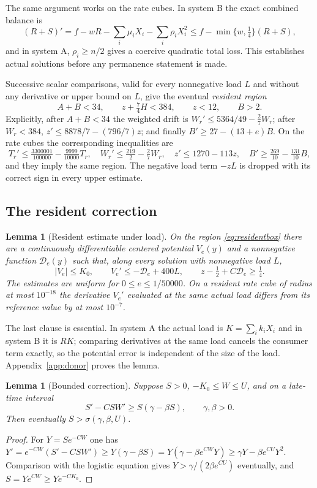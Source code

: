 \documentclass[11pt,a4paper]{article}
\theoremstyle{plain}
\newtheorem{lemma}[theorem]{Lemma}
\theoremstyle{definition}
\theoremstyle{remark}
\newcommand{\D}{\mathcal D}
\begin{document}
The same argument works on the rate cubes. In system B the exact combined balance is
\[
(R+S)'=f-wR-\sum_i\mu_iX_i-\sum_i\rho_iX_i^2\le f-\min\{w,\tfrac14\}(R+S),
\]
and in system A, $\rho_i\ge n/2$ gives a coercive quadratic total loss. This establishes actual solutions before any permanence statement is made.

Successive scalar comparisons, valid for every nonnegative load $L$ and without any derivative or upper bound on $L$, give the eventual \emph{resident region}
\begin{equation}\label{eq:residentbox}
A+B<34,\qquad z+\tfrac74H<384,\qquad z<12,\qquad B>2.
\end{equation}
Explicitly, after $A+B<34$ the weighted drift is $W_r'\le5364/49-\tfrac27W_r$; after $W_r<384$, $z'\le8878/7-(796/7)z$; and finally $B'\ge27-(13+e)B$. On the rate cubes the corresponding inequalities are
\[
T_r'\le\tfrac{3300001}{100000}-\tfrac{9999}{10000}T_r,\quad
W_r'\le\tfrac{219}2-\tfrac27W_r,\quad
z'\le1270-113z,\quad B'\ge\tfrac{269}{10}-\tfrac{131}{10}B,
\]
and they imply the same region. The negative load term $-zL$ is dropped with its correct sign in every upper estimate.

\subsection{The resident correction}\label{sec:correction}
\begin{lemma}[Resident estimate under load]\label{lem:donor}
On the region \eqref{eq:residentbox} there are a continuously differentiable centered potential $V_e(y)$ and a nonnegative function $\D_e(y)$ such that, along every solution with nonnegative load $L$,
\begin{equation}\label{eq:donor}
|V_e|\le K_0,\qquad V_e'\le-\D_e+400L,\qquad z-\tfrac12+C\D_e\ge\tfrac14 .
\end{equation}
The estimates are uniform for $0\le e\le1/50000$. On a resident rate cube of radius at most $10^{-18}$ the derivative $V_e'$ evaluated at the same actual load differs from its reference value by at most $10^{-7}$.
\end{lemma}
The last clause is essential. In system A the actual load is $K=\sum_ik_iX_i$ and in system B it is $RK$; comparing derivatives at the same load cancels the consumer term exactly, so the potential error is independent of the size of the load. Appendix~\ref{app:donor} proves the lemma.

\begin{lemma}[Bounded correction]\label{lem:corrector}
Suppose $S>0$, $-K_0\le W\le U$, and on a late-time interval
\[
S'-CSW'\ge S(\gamma-\beta S),\qquad\gamma,\beta>0.
\]
Then eventually $S>\sigma(\gamma,\beta,U)$.
\end{lemma}
\begin{proof}
For $Y=Se^{-CW}$ one has $Y'=e^{-CW}(S'-CSW')\ge Y(\gamma-\beta S)=Y(\gamma-\beta e^{CW}Y)\ge\gamma Y-\beta e^{CU}Y^2$. Comparison with the logistic equation gives $Y>\gamma/(2\beta e^{CU})$ eventually, and $S=Ye^{CW}\ge Ye^{-CK_0}$.
\end{proof}
\end{document}
